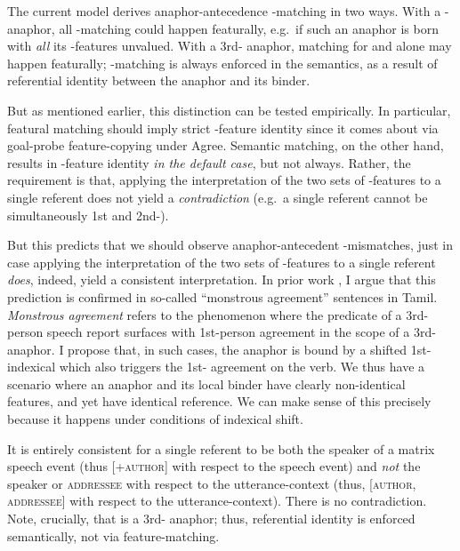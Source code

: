 \documentclass[output=paper, modfonts, nonflat]{langsci/langscibook}
\begin{document}
  The current model derives anaphor-antecedence \ph-matching in two
  ways. With a \nul-\person{} anaphor, all \ph-matching could happen
  featurally, e.g.\ if such an anaphor is born with \emph{all} its
  \ph-features unvalued. With a 3rd-\person{} anaphor, matching for
  \num{} and \gender{} alone may happen featurally; \person-matching
  is always enforced in the semantics, as a result of referential
  identity between the anaphor and its binder.

  But as mentioned earlier, this distinction can be tested
  empirically. In particular, featural matching should imply strict
  \ph-feature identity since it comes about via goal-probe
  feature-copying under Agree. Semantic matching, on the other hand,
  results in \ph-feature identity \emph{in the default case}, but not
  always. Rather, the requirement is that, applying the interpretation
  of the two sets of \ph-features to a single referent does not yield
  a \emph{contradiction} (e.g.\ a single referent cannot be
  simultaneously 1st and 2nd-\person). 

  But this predicts that we should observe anaphor-antecedent
  \ph-mismatches, just in case applying the interpretation of the two
  sets of \ph-features to a single referent \emph{does}, indeed, yield
  a consistent interpretation. In prior work \citep{sundaresan:2012,
    sundaresan:2018}, I argue that this prediction is confirmed in
  so-called ``monstrous agreement'' sentences in Tamil. {\itshape Monstrous
    agreement} refers to the phenomenon where the predicate of a
  3rd-person speech report surfaces with 1st-person agreement in the
  scope of a 3rd-\person{} anaphor. I propose that, in such cases, the
  anaphor \taan{} is bound by a shifted 1st-\person{} indexical
  \citep{schlenker:2003, anand:2006} which also triggers the
  1st-\person{} agreement on the verb. We thus have a scenario where
  an anaphor and its local binder have clearly non-identical \person{}
  features, and yet have identical reference.  We can make sense of
  this precisely because it happens under conditions of indexical
  shift.
  
  It is entirely consistent for a single referent to be both the
  speaker of a matrix speech event (thus [+\textsc{author}] with respect to the
  speech event) and \textit{not} the speaker or \textsc{addressee} with respect
  to the utterance-context (thus, [\textminus \textsc{author}, \textminus\textsc{addressee}] with respect
  to the utterance-context). There is no contradiction. Note,
  crucially, that \taan{} is a 3rd-\person{} anaphor; thus,
  referential identity is enforced semantically, not via
  feature-matching.
  
\end{document}
